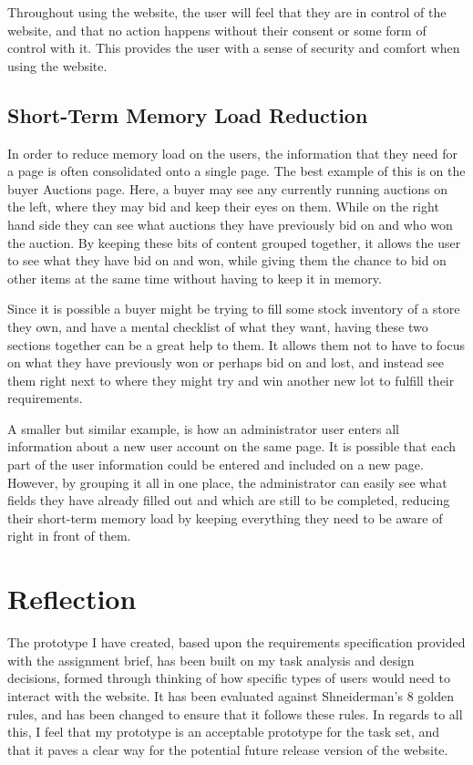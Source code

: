 \documentclass{article}
\begin{document}
Throughout using the website, the user will feel that they are in control of the website, and that no action happens without their consent or some form of control with it. This provides the user with a sense of security and comfort when using the website.

\subsection{Short-Term Memory Load Reduction}
In order to reduce memory load on the users, the information that  they need for a page is often consolidated onto a single page. The best example of this is on the buyer Auctions page. Here, a buyer may see any currently running auctions on the left, where they may bid and keep their eyes on them. While on the right hand side they can see what auctions they have previously bid on and who won the auction. By keeping these bits of content grouped together, it allows the user to see what they have bid on and won, while giving them the chance to bid on other items at the same time without having to keep it in memory.

Since it is possible a buyer might be trying to fill some stock inventory of a store they own, and have a mental checklist of what they want, having these two sections together can be a great help to them. It allows them not to have to focus on what they have previously won or perhaps bid on and lost, and instead see them right next to where they might try and win another new lot to fulfill their requirements.

A smaller but similar example, is how an administrator user enters all information about a new user account on the same page. It is possible that each part of the user information could be entered and included on a new page. However, by grouping it all in one place, the administrator can easily see what fields they have already filled out and which are still to be completed, reducing their short-term memory load by keeping everything they need to be aware of right in front of them.


\section{Reflection}
The prototype I have created, based upon the requirements specification provided with the assignment brief, has been built on my task analysis and design decisions, formed through thinking of how specific types of users would need to interact with the website. It has been evaluated against Shneiderman's 8 golden rules, and has been changed to ensure that it follows these rules. In regards to all this, I feel that my prototype is an acceptable prototype for the task set, and that it paves a clear way for the potential future release version of the website.
\end{document}

